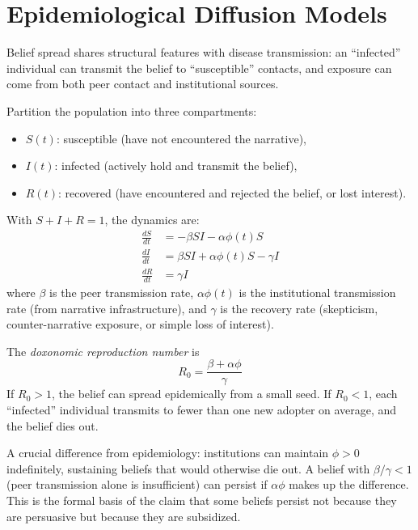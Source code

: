 \section{Epidemiological Diffusion Models}
\label{sec:ch11-sir}

Belief spread shares structural features with disease transmission: an ``infected'' individual can transmit the belief to ``susceptible'' contacts, and exposure can come from both peer contact and institutional sources.

\begin{model}
\label{mod:sir-belief}
Partition the population into three compartments:
\begin{itemize}[nosep]
  \item $S(t)$: susceptible (have not encountered the narrative),
  \item $I(t)$: infected (actively hold and transmit the belief),
  \item $R(t)$: recovered (have encountered and rejected the belief, or lost interest).
\end{itemize}
With $S + I + R = 1$, the dynamics are:
\begin{align}
  \frac{dS}{dt} &= -\beta S I - \alpha \phi(t) S \label{eq:sir-s}\\
  \frac{dI}{dt} &= \beta S I + \alpha \phi(t) S - \gamma I \label{eq:sir-i}\\
  \frac{dR}{dt} &= \gamma I \label{eq:sir-r}
\end{align}
where $\beta$ is the peer transmission rate, $\alpha\phi(t)$ is the institutional transmission rate (from narrative infrastructure), and $\gamma$ is the recovery rate (skepticism, counter-narrative exposure, or simple loss of interest).
\end{model}

\begin{definition}
\label{def:R0}
The \emph{doxonomic reproduction number} is
\[
  R_0 = \frac{\beta + \alpha\phi}{\gamma}
\]
If $R_0 > 1$, the belief can spread epidemically from a small seed.
If $R_0 < 1$, each ``infected'' individual transmits to fewer than one new adopter on average, and the belief dies out.
\end{definition}

A crucial difference from epidemiology: institutions can maintain $\phi > 0$ indefinitely, sustaining beliefs that would otherwise die out.
A belief with $\beta/\gamma < 1$ (peer transmission alone is insufficient) can persist if $\alpha\phi$ makes up the difference.
This is the formal basis of the claim that some beliefs persist not because they are persuasive but because they are subsidized.

